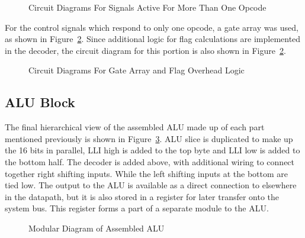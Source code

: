 \begin{figure}[h]
	\caption{Circuit Diagrams For Signals Active For More Than One Opcode}
	\label{fig:DecMultiCirs}
\end{figure}

For the control signals which respond to only one opcode, a gate array was used, as shown in Figure~\ref{fig:GateArray}. 
Since additional logic for flag calculations are implemented in the decoder, the circuit diagram for this portion is also shown in Figure~\ref{fig:GateArray}. 

\begin{figure}[h]
	\caption{Circuit Diagrams For Gate Array and Flag Overhead Logic}
	\label{fig:GateArray}
\end{figure}

\subsection{ALU Block}
The final hierarchical view of the assembled ALU made up of each part mentioned previously is shown in Figure~\ref{fig:ALUAssembled}. 
ALU slice is duplicated to make up the 16 bits in parallel, LLI high is added to the top byte and LLI low is added to the bottom half. 
The decoder is added above, with additional wiring to connect together right shifting inputs. 
While the left shifting inputs at the bottom are tied low. 
The output to the ALU is available as a direct connection to elsewhere in the datapath, but it is also stored in a register for later transfer onto the system bus. 
This register forms a part of a separate module to the ALU. 

\begin{figure}[h]
	\caption{Modular Diagram of Assembled ALU}
	\label{fig:ALUAssembled}
\end{figure}
